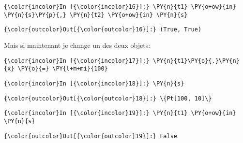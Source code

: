     \begin{Verbatim}[commandchars=\\\{\},frame=single,framerule=0.3mm,rulecolor=\color{cellframecolor}]
{\color{incolor}In [{\color{incolor}16}]:} \PY{n}{t1} \PY{o+ow}{in} \PY{n}{s}\PY{p}{,} \PY{n}{t2} \PY{o+ow}{in} \PY{n}{s}
\end{Verbatim}


\begin{Verbatim}[commandchars=\\\{\},frame=single,framerule=0.3mm,rulecolor=\color{cellframecolor}]
{\color{outcolor}Out[{\color{outcolor}16}]:} (True, True)
\end{Verbatim}
            
    Mais si maintenant je change un des deux objets:

    \begin{Verbatim}[commandchars=\\\{\},frame=single,framerule=0.3mm,rulecolor=\color{cellframecolor}]
{\color{incolor}In [{\color{incolor}17}]:} \PY{n}{t1}\PY{o}{.}\PY{n}{x} \PY{o}{=} \PY{l+m+mi}{100}
\end{Verbatim}


    \begin{Verbatim}[commandchars=\\\{\},frame=single,framerule=0.3mm,rulecolor=\color{cellframecolor}]
{\color{incolor}In [{\color{incolor}18}]:} \PY{n}{s}
\end{Verbatim}


\begin{Verbatim}[commandchars=\\\{\},frame=single,framerule=0.3mm,rulecolor=\color{cellframecolor}]
{\color{outcolor}Out[{\color{outcolor}18}]:} \{Pt[100, 10]\}
\end{Verbatim}
            
    \begin{Verbatim}[commandchars=\\\{\},frame=single,framerule=0.3mm,rulecolor=\color{cellframecolor}]
{\color{incolor}In [{\color{incolor}19}]:} \PY{n}{t1} \PY{o+ow}{in} \PY{n}{s}
\end{Verbatim}


\begin{Verbatim}[commandchars=\\\{\},frame=single,framerule=0.3mm,rulecolor=\color{cellframecolor}]
{\color{outcolor}Out[{\color{outcolor}19}]:} False
\end{Verbatim}
            
